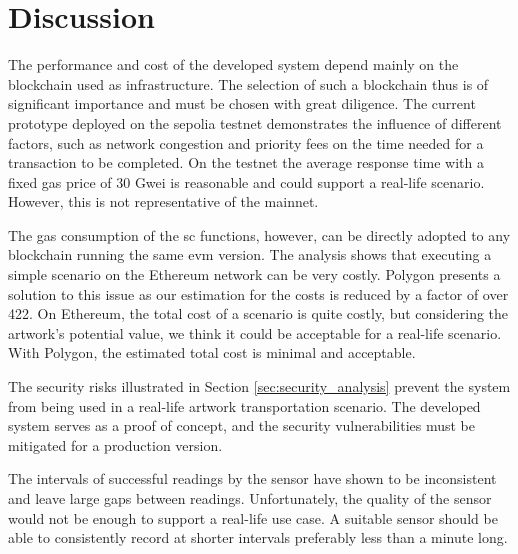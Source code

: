 \section{Discussion}
\label{sec:eval_discussion}
The performance and cost of the developed system depend mainly on the blockchain used as infrastructure. The selection of such a blockchain thus is of significant importance and must be chosen with great diligence. The current prototype deployed on the sepolia testnet demonstrates the influence of different factors, such as network congestion and priority fees on the time needed for a transaction to be completed. On the testnet the average response time with a fixed gas price of 30 Gwei is reasonable and could support a real-life scenario. However, this is not representative of the mainnet.

The gas consumption of the \gls{sc} functions, however, can be directly adopted to any blockchain running the same \gls{evm} version. The analysis shows that executing a simple scenario on the Ethereum network can be very costly. Polygon presents a solution to this issue as our estimation for the costs is reduced by a factor of over 422. On Ethereum, the total cost of a scenario is quite costly, but considering the artwork's potential value, we think it could be acceptable for a real-life scenario. With Polygon, the estimated total cost is minimal and acceptable.

The security risks illustrated in Section \ref{sec:security_analysis} prevent the system from being used in a real-life artwork transportation scenario. The developed system serves as a proof of concept, and the security vulnerabilities must be mitigated for a production version.

The intervals of successful readings by the sensor have shown to be inconsistent and leave large gaps between readings. Unfortunately, the quality of the sensor would not be enough to support a real-life use case. A suitable sensor should be able to consistently record at shorter intervals preferably less than a minute long.

